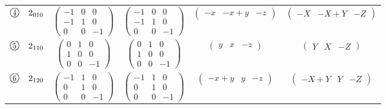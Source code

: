 \documentclass[fleqn,10pt,landscape]{jsarticle}
\begin{document}
\begin{center}
\begin{longtable}{lcccc}
$ {\ooalign{\hfil\resizebox{.8\width}{\height}{4}\hfil\crcr\raise.1ex\hbox{\large$\bigcirc$}}}\quad 2{}_{010} $ & $ \begin{pmatrix} -1 & 0 & 0 \\ -1 & 1 & 0 \\ 0 & 0 & -1 \end{pmatrix} $ & $ \begin{pmatrix} -1 & 0 & 0 \\ -1 & 1 & 0 \\ 0 & 0 & -1 \end{pmatrix} $ & $ \begin{pmatrix} - x & - x + y & - z \end{pmatrix} $ & $ \begin{pmatrix} - X & - X + Y & - Z \end{pmatrix} $ \\
$ {\ooalign{\hfil\resizebox{.8\width}{\height}{5}\hfil\crcr\raise.1ex\hbox{\large$\bigcirc$}}}\quad 2{}_{110} $ & $ \begin{pmatrix} 0 & 1 & 0 \\ 1 & 0 & 0 \\ 0 & 0 & -1 \end{pmatrix} $ & $ \begin{pmatrix} 0 & 1 & 0 \\ 1 & 0 & 0 \\ 0 & 0 & -1 \end{pmatrix} $ & $ \begin{pmatrix} y & x & - z \end{pmatrix} $ & $ \begin{pmatrix} Y & X & - Z \end{pmatrix} $ \\
$ {\ooalign{\hfil\resizebox{.8\width}{\height}{6}\hfil\crcr\raise.1ex\hbox{\large$\bigcirc$}}}\quad 2{}_{120} $ & $ \begin{pmatrix} -1 & 1 & 0 \\ 0 & 1 & 0 \\ 0 & 0 & -1 \end{pmatrix} $ & $ \begin{pmatrix} -1 & 1 & 0 \\ 0 & 1 & 0 \\ 0 & 0 & -1 \end{pmatrix} $ & $ \begin{pmatrix} - x + y & y & - z \end{pmatrix} $ & $ \begin{pmatrix} - X + Y & Y & - Z \end{pmatrix} $ \\

\end{longtable}
\end{center}
\end{document}
